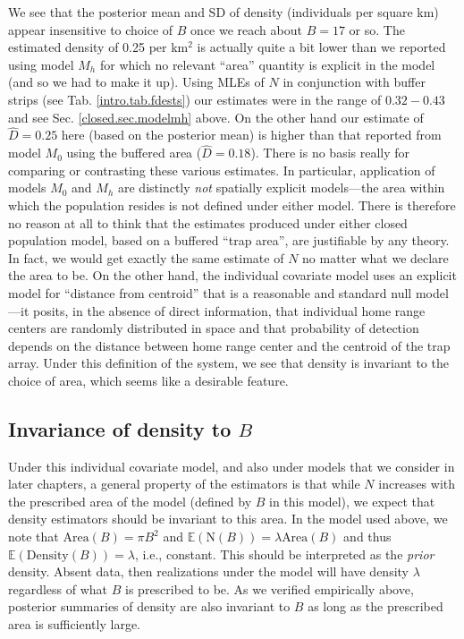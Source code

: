 We see that the posterior mean and SD of density (individuals per
square km) appear insensitive to choice of $B$ once we reach about
$B=17$ or so.
The estimated density of
0.25 per km$^2$ is actually quite a bit lower than we reported using
model $M_h$ for which no relevant ``area'' quantity is explicit in the
model (and so we had to make it up).  Using MLEs of $N$ in conjunction with buffer strips (see Tab.
\ref{intro.tab.fdests}) our estimates were in the range of
$0.32-0.43$ and see Sec.  \ref{closed.sec.modelmh} above.  On the
other hand our estimate of $\hat{D} = 0.25$ here (based on the
posterior mean) is higher than that reported from model $M_0$ using
the buffered area ($\hat{D} = 0.18$). There is no basis really for comparing or
contrasting these various estimates.
In
particular, application of models $M_0$ and $M_h$ are distinctly {\it
  not} spatially explicit models---the area within which the
population resides is not defined under either model. There is
therefore no reason at all to think that the estimates produced under
either closed population model, based on a buffered ``trap area'', are
justifiable by any theory. In fact, we would get exactly the same
estimate of $N$ no matter what we declare the area to be. On the other
hand, the individual covariate model uses an explicit model for
 ``distance from centroid'' that is a reasonable and
standard null model---it posits, in the absence of direct information,
that individual home range centers are randomly distributed in space
and that probability of detection depends on the distance between home
range center and the centroid of the trap array. Under this definition
of the system, we see that density is invariant to the choice of area,
which seems like a desirable feature.


\subsection{Invariance of density to $B$}

Under this individual covariate model, and also under models that we
consider in later chapters, a general property of the estimators is
that while $N$ increases with the prescribed area of the model
(defined by $B$ in this model),
 we expect that density estimators should be
invariant to this area. In the model used above, we note that
$\mbox{Area}(B) = \pi B^{2}$ and $\mathbb{E}(\mbox{N}(B)) = \lambda
\mbox{Area}(B)$ and thus $\mathbb{E}(\mbox{Density}(B)) = \lambda$,
i.e., constant. This should be interpreted as the {\it prior}
density. Absent data, then realizations under the model will have
density $\lambda$ regardless of what $B$ is prescribed to be.  As we
verified empirically above,  posterior summaries of density are also invariant to
$B$ as long as the prescribed area is sufficiently large.

